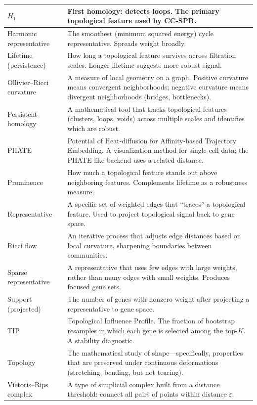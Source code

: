 \documentclass[11pt]{article}
\begin{document}
\begin{longtable}{p{3.5cm}p{9cm}}
\midrule
$H_1$ & First homology: detects loops. The primary topological feature used by CC-SPR. \\
\midrule
Harmonic representative & The smoothest (minimum squared energy) cycle representative. Spreads weight broadly. \\
\midrule
Lifetime (persistence) & How long a topological feature survives across filtration scales. Longer lifetime suggests more robust signal. \\
\midrule
Ollivier--Ricci curvature & A measure of local geometry on a graph. Positive curvature means convergent neighborhoods; negative curvature means divergent neighborhoods (bridges, bottlenecks). \\
\midrule
Persistent homology & A mathematical tool that tracks topological features (clusters, loops, voids) across multiple scales and identifies which are robust. \\
\midrule
PHATE & Potential of Heat-diffusion for Affinity-based Trajectory Embedding. A visualization method for single-cell data; the PHATE-like backend uses a related distance. \\
\midrule
Prominence & How much a topological feature stands out above neighboring features. Complements lifetime as a robustness measure. \\
\midrule
Representative & A specific set of weighted edges that ``traces'' a topological feature. Used to project topological signal back to gene space. \\
\midrule
Ricci flow & An iterative process that adjusts edge distances based on local curvature, sharpening boundaries between communities. \\
\midrule
Sparse representative & A representative that uses few edges with large weights, rather than many edges with small weights. Produces focused gene sets. \\
\midrule
Support (projected) & The number of genes with nonzero weight after projecting a representative to gene space. \\
\midrule
TIP & Topological Influence Profile. The fraction of bootstrap resamples in which each gene is selected among the top-$K$. A stability diagnostic. \\
\midrule
Topology & The mathematical study of shape---specifically, properties that are preserved under continuous deformations (stretching, bending, but not tearing). \\
\midrule
Vietoris--Rips complex & A type of simplicial complex built from a distance threshold: connect all pairs of points within distance $\varepsilon$. \\
\bottomrule
\end{longtable}
\end{document}
